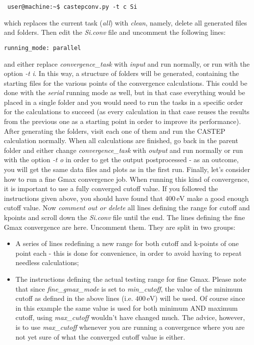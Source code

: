 \documentclass[10pt]{article}
\begin{document}
\begin{lstlisting}
 user@machine:~$ castepconv.py -t c Si
\end{lstlisting}

which replaces the current task (\textit{all}) with \textit{clean}, namely, delete all generated files and folders. Then edit the \textit{Si.conv} file and uncomment the following lines:

\begin{lstlisting}
running_mode: parallel
\end{lstlisting}

and either replace \textit{convergence\_task} with \textit{input} and run normally, or run with the option \textit{-t i}. In this way, a structure of folders will be generated, containing the starting files for the various points of the convergence calculations. This could be done with the \textit{serial} running mode as well, but in that case everything would be placed in a single folder and you would need to run the tasks in a specific order for the calculations to succeed (as every calculation in that case reuses the results from the previous one as a starting point in order to improve its performance). After generating the folders, visit each one of them and run the CASTEP calculation normally. When all calculations are finished, go back in the parent folder and either change \textit{convergence\_task} with \textit{output} and run normally or run with the option \textit{-t o} in order to get the output postprocessed - as an outcome, you will get the same data files and plots as in the first run.\newline
Finally, let's consider how to run a fine Gmax convergence job. When running this kind of convergence, it is important to use a fully converged cutoff value. If you followed the instructions given above, you should have found that $400\,\mathrm{eV}$ make a good enough cutoff value. Now \textit{comment out or delete} all lines defining the range for cutoff and kpoints and scroll down the \textit{Si.conv} file until the end. The lines defining the fine Gmax convergence are here. Uncomment them. They are split in two groups:

\begin{itemize}
 \item A series of lines redefining a new range for both cutoff and k-points of one point each - this is done for convenience, in order to avoid having to repeat needless calculations;
 \item The instructions defining the actual testing range for fine Gmax. Please note that since \textit{fine\_gmax\_mode} is set to \textit{min\_cutoff}, the value of the minimum cutoff as defined in the above lines (i.e. $400\,\mathrm{eV}$) will be used. Of course since in this example the same value is used for both minimum AND maximum cutoff, using \textit{max\_cutoff} wouldn't have changed much. The advice, however, is to use \textit{max\_cutoff} whenever you are running a convergence where you are not yet sure of what the converged cutoff value is either.
\end{itemize}
\end{document}
